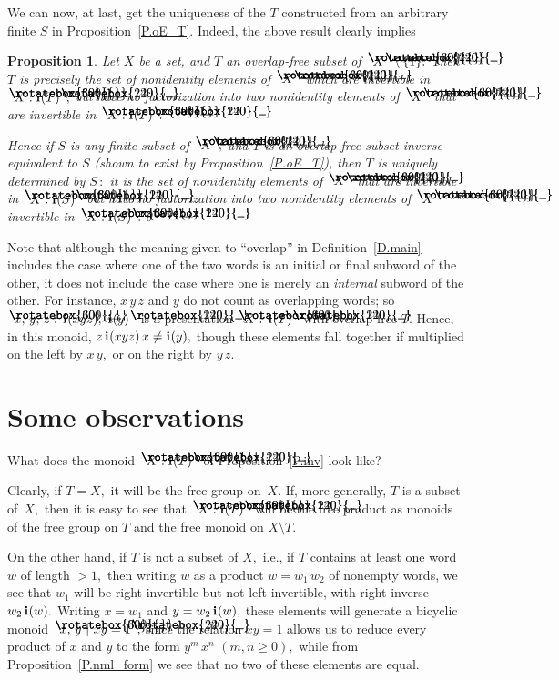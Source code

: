 \documentclass{amsart}
\newtheorem{proposition}[equation]{Proposition}
\numberwithin{equation}{section}
\newcommand{\I}{\mathbf{i}\hspace{.05em}}
\newcommand{\langl}{\begin{picture}(.51em,1em)
\put(.11em,.33em){\rotatebox{60}{\line(1,0){.55em}}}
\put(.11em,.33em){\rotatebox{300}{\line(1,0){.55em}}}
\end{picture}}
\newcommand{\rangl}{\begin{picture}(.5em,1em)
\put(.09em,.33em){\rotatebox{120}{\line(1,0){.55em}}}
\put(.09em,.33em){\rotatebox{240}{\line(1,0){.55em}}}
\end{picture}}
\begin{document}
We can now, at last, get the uniqueness of the $T$
constructed from an arbitrary finite $S$
in Proposition~\ref{P.oE_T}.
Indeed, the above result clearly implies

\begin{proposition}\label{P.T=mnl}
Let $X$ be a set, and $T$ an overlap-free subset
of $\langl X\rangl\setminus\{1\}.$
Then $T$ is precisely the set of nonidentity
elements of $\langl X\rangl$ which are invertible
in $\langl X:\I(T)\rangl,$ but have no
factorization into two nonidentity elements of $\langl X\rangl$
that are invertible in $\langl X:\I(T)\rangl.$

Hence if $S$ is any finite subset of $\langl X\rangl,$
and $T$ is an overlap-free subset inverse-equivalent to $S$
{\rm(}shown to exist by Proposition~\ref{P.oE_T}{\rm)},
then $T$ is uniquely determined by $S{\,:}$ it is the
set of nonidentity elements of $\langl X\rangl$ that are invertible
in $\langl X:\I(S)\rangl$ but have no factorization into two
nonidentity elements of $\langl X\rangl$
invertible in $\langl X:\I(S)\rangl.$\qed
\end{proposition}

Note that although the meaning given to ``overlap'' in
Definition~\ref{D.main} includes the case where one of the two words
is an initial or final subword of the other, it does
not include the case where one is merely an {\em internal}
subword of the other.
For instance, $x\,y\,z$ and $y$ do not count
as overlapping words;
so $\langl x,\,y,\,z:\,\I(xyz),~\I(y)\rangl$ is a presentation
$\langl X:\,\I(T)\rangl$ with overlap-free $T.$
Hence, in this monoid, $z\,\I(xyz)\,x\neq\I(y),$
though these elements fall together if multiplied on
the left by $x\,y,$ or on the right by $y\,z.$

\section{Some observations}\label{S.observations}

What does the monoid $\langl X:\I(T)\rangl$
of Proposition~\ref{P.inv} look like?

Clearly, if $T=X,$ it will be the free group on~$X.$
If, more generally, $T$ is a subset of~$X,$ then
it is easy to see that $\langl X:\I(T)\rangl$
will be the free product as monoids of the free group
on $T$ and the free monoid on $X\setminus T.$

On the other hand, if $T$ is not a subset of $X,$ i.e., if
$T$ contains at least one word $w$ of length $>1,$
then writing $w$ as a product $w=w_1\,w_2$ of nonempty words,
we see that $w_1$ will be right invertible but not
left invertible, with right inverse $w_2\,\I(w).$
Writing $x=w_1$ and $y= w_2\,\I(w),$
these elements will generate a bicyclic monoid
$\langl x,\,y~|~xy=1\rangl,$ since the relation
$xy=1$ allows us to reduce every product of $x$ and $y$
to the form $y^m\,x^n$ $(m,n\geq 0),$ while from
Proposition~\ref{P.nml_form} we see that no two
of these elements are equal.
\end{document}
